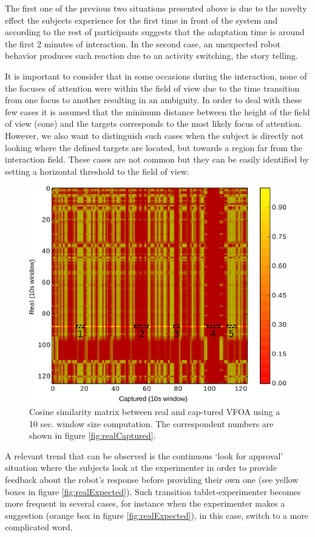 \documentclass{sig-alternate}
\begin{document}
The first one of the previous two situations presented above is due to the novelty effect the subjects experience for the first time in front of the system and according to the rest of participants suggests that the adaptation time is around the first 2 minutes of interaction. In the second case, an unexpected robot behavior produces such reaction due to an activity switching, the story telling.

It is important to consider that in some occasions during the interaction, none of the focuses of attention were within the field of view due to the time transition from one focus to another resulting in an ambiguity. In order to deal with these few cases it is assumed that the minimum distance between the height of the field of view (cone) and the targets corresponds to the most likely focus of attention. However, we also want to distinguish such cases when the subject is directly not looking where the defined targets are located, but towards a region far from the interaction field. These cases are not common but they can be easily identified by setting a horizontal threshold to the field of view.

\begin{figure}[h!]
    \centering
    \includegraphics[width=0.8\columnwidth]{bitmap}
    \caption{\small Cosine similarity matrix between real and cap-tured VFOA using a 10 sec. window size computation. The correspondent numbers are shown in figure \ref{fig:realCaptured}.}
    \label{fig:bitmap}
\end{figure}

A relevant trend that can be observed is the continuous `look for approval' situation where the subjects look at the experimenter in order to provide feedback about the robot's response before providing their own one (see yellow boxes in figure \ref{fig:realExpected}). Such transition tablet-experimenter becomes more frequent in several cases, for instance when the experimenter makes a suggestion (orange box in figure \ref{fig:realExpected}), in this case, switch to a more complicated word.
\end{document}
